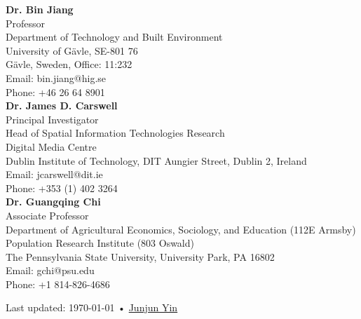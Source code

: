 \documentclass[11pt, a4paper]{article}
\begin{document}
\textbf{Dr. Bin Jiang}\\
Professor\\
Department of Technology and Built Environment\\
University of Gävle, SE-801 76\\
Gävle, Sweden, Office: 11:232\\
Email: bin.jiang@hig.se\\
Phone: +46 26 64 8901\\

\textbf{Dr. James D. Carswell}\\
Principal Investigator\\
Head of Spatial Information Technologies Research\\
Digital Media Centre\\
Dublin Institute of Technology, DIT Aungier Street, Dublin 2, Ireland\\
Email: jcarswell@dit.ie\\
Phone: +353 (1) 402 3264\\

\textbf{Dr. Guangqing Chi}\\
Associate Professor\\
Department of Agricultural Economics, Sociology, and Education (112E Armsby)\\
Population Research Institute (803 Oswald)\\
The Pennsylvania State University, University Park, PA 16802\\
Email: gchi@psu.edu\\
Phone: +1 814-826-4686
\vfill{}

\begin{center}
{\scriptsize  Last updated: \today\- •\- 
\href{https://yinjunjun.github.io/home/}{Junjun Yin}}
\end{center}
\end{document}
